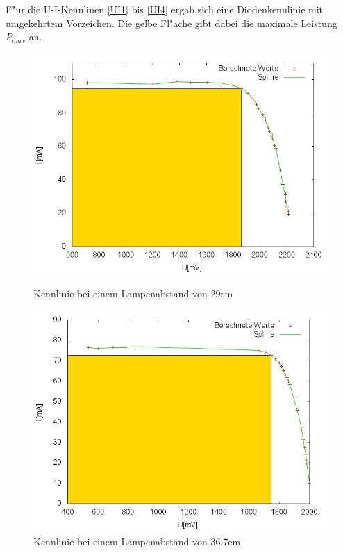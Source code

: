 	F"ur die U-I-Kennlinen \eqref{UI1} bis \eqref{UI4} ergab sich eine Diodenkennlinie mit umgekehrtem Vorzeichen.
	Die gelbe Fl"ache gibt dabei die maximale Leistung $P_{max}$ an.\\

	
	
	
	

	\begin{figure}[htbp]
		\centering
		\includegraphics[width = 12cm]{img/290.jpg}
		\caption{Kennlinie bei einem Lampenabstand von 29cm	}
		\label{UI1}

		\centering
		\includegraphics[width = 12cm]{img/367.jpg}
		\caption{Kennlinie bei einem Lampenabstand von 36.7cm}
		\label{UI2}
	\end{figure}
